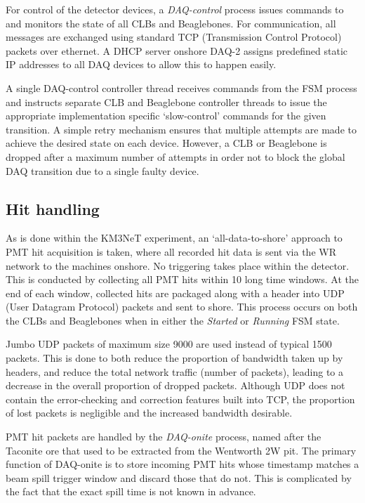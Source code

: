 For control of the detector devices, a \emph{DAQ-control} process issues commands to and monitors
the state of all CLBs and Beaglebones. For communication, all messages are exchanged using
standard TCP (Transmission Control Protocol) packets over ethernet. A DHCP server onshore DAQ-2
assigns predefined static IP addresses to all DAQ devices to allow this to happen easily. 

A single DAQ-control controller thread receives commands from the FSM process and instructs
separate CLB and Beaglebone controller threads to issue the appropriate implementation specific
`slow-control' commands for the given transition. A simple retry mechanism ensures that multiple
attempts are made to achieve the desired state on each device. However, a CLB or Beaglebone is
dropped after a maximum number of attempts in order not to block the global DAQ transition due to
a single faulty device.

\subsection{Hit handling} %
\label{sec:daq_soft_hits} %

As is done within the KM3NeT experiment, an `all-data-to-shore' approach to PMT hit acquisition is
taken, where all recorded hit data is sent via the WR network to the machines onshore. No
triggering takes place within the detector. This is conducted by collecting all PMT hits within
\unit{10}{} long time windows. At the end of each window, collected hits are packaged
along with a header into UDP (User Datagram Protocol) packets and sent to shore. This process
occurs on both the CLBs and Beaglebones when in either the \emph{Started} or \emph{Running} FSM
state.

Jumbo UDP packets of maximum size \unit{9000}{} are used instead of typical
\unit{1500}{} packets. This is done to both reduce the proportion of bandwidth taken up
by headers, and reduce the total network traffic (number of packets), leading to a decrease in the
overall proportion of dropped packets. Although UDP does not contain the error-checking and
correction features built into TCP, the proportion of lost packets is negligible and the increased
bandwidth desirable.

PMT hit packets are handled by the \emph{DAQ-onite} process, named after the Taconite ore that
used to be extracted from the Wentworth 2W pit. The primary function of DAQ-onite is to store
incoming PMT hits whose timestamp matches a \numi beam spill trigger window and discard those that
do not. This is complicated by the fact that the exact \numi spill time is not known in advance. 

